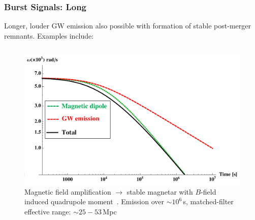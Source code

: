 \documentclass[serif,mathserif,10pt]{beamer}
\let\oldframetitle\frametitle%
\renewcommand{\frametitle}[1]{%
      \oldframetitle{#1}\setstretch{1.2}}
\begin{document}
\begin{frame}
    \frametitle{Burst Signals: Long}

    Longer, louder GW emission also possible with formation of stable
    post-merger remnants.  Examples include:

    \begin{columns}



        \begin{center}
            \vspace{-0.1cm}
            \begin{figure}
                \includegraphics[width=1\columnwidth]{figures/dallosso.png}
                \caption{Magnetic field amplification $\rightarrow$ stable
                magnetar with $B$-field induced quadrupole
            moment~\cite{2015ApJ...798...25D}.  Emission over $\sim 10^6$\,s,
        matched-filter effective range: $\sim 25-53$\,Mpc}
            \end{figure}
        \end{center}



\end{columns}
\end{frame}
\end{document}
